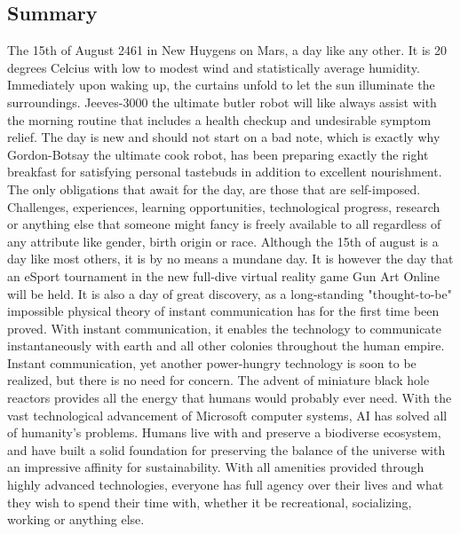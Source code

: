 \subsection{Summary}
The 15th of August 2461 in New Huygens on Mars, a day like any other. It is 20 degrees Celcius with low to modest wind and statistically average humidity. 
Immediately upon waking up, the curtains unfold to let the sun illuminate the surroundings. 
Jeeves-3000 the ultimate butler robot will like always assist with the morning routine that includes a health checkup and undesirable symptom relief.
The day is new and should not start on a bad note, which is exactly why Gordon-Botsay the ultimate cook robot, has been preparing exactly the right breakfast for satisfying personal tastebuds in addition to excellent nourishment. 
The only obligations that await for the day, are those that are self-imposed. 
Challenges, experiences, learning opportunities, technological progress, research or anything else that someone might fancy is freely available to all regardless of any attribute like gender, birth origin or race.
Although the 15th of august is a day like most others, it is by no means a mundane day. 
It is however the day that an eSport tournament in the new full-dive virtual reality game Gun Art Online will be held.
It is also a day of great discovery, as a long-standing "thought-to-be" impossible physical theory of instant communication has for the first time been proved. 
With instant communication, it enables the technology to communicate instantaneously with earth and all other colonies throughout the human empire.  
Instant communication, yet another power-hungry technology is soon to be realized, but there is no need for concern.
The advent of miniature black hole reactors provides all the energy that humans would probably ever need.
With the vast technological advancement of Microsoft computer systems, AI has solved all of humanity's problems. 
Humans live with and preserve a biodiverse ecosystem, and have built a solid foundation for preserving the balance of the universe with an impressive affinity for sustainability.
With all amenities provided through highly advanced technologies, everyone has full agency over their lives and what they wish to spend their time with, whether it be recreational, socializing, working or anything else.

